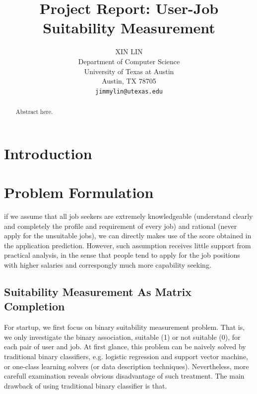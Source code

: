 \documentclass{article} %
\title{Project Report: User-Job Suitability Measurement}
\author{
XIN LIN \\
Department of Computer Science\\
University of Texas at Austin \\
Austin, TX 78705 \\
\texttt{jimmylin@utexas.edu} \\
}
\begin{document}
\maketitle

\begin{abstract}
    Abstract here.
\end{abstract}





\section{Introduction}

\section{Problem Formulation}

if we assume that all job seekers are extremely knowledgeable (understand
clearly and completely the profile and requirement of every job) and rational
(never apply for the unsuitable jobs), we can directly makes use of the score
obtained in the application prediction. However, such assumption receives
little support from practical analysis, in the sense that people tend to apply
for the job positions with higher salaries and correspongly much more
capability seeking.

\subsection{Suitability Measurement As Matrix Completion}
For startup, we first focus on binary suitability measurement problem. That
is, we only investigate the binary association, suitable (1) or not suitable
(0), for each pair of user and job. 
At first glance, this problem can be naively solved by traditional binary
classifiers, e.g. logistic regression and support vector machine, or one-class
learning solvers (or data description techniques).
Nevertheless, more carefull examination reveals obvious disadvantage of such
treatment. The main drawback of using traditional binary classifier is that.
\end{document}

